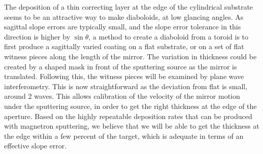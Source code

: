 \documentclass{iucr}       %
\begin{document}
The deposition of a thin correcting layer at the edge of the cylindrical substrate seems to be an attractive way to make diaboloids, at low glancing angles. %
As sagittal slope errors are typically small, and the slope error tolerance in this direction is higher by $\sin\theta$, a method to create a diaboloid from a toroid is to first produce a sagittally varied coating on a flat substrate, or on a set of flat witness pieces along the length of the mirror. The variation in thickness could be created by a shaped mask in front of the sputtering source as the mirror is translated. Following this, the witness pieces will be examined by plane wave interferometry. This is now straightforward as the deviation from flat is small, around 2 waves. This allows calibration of the velocity of the mirror motion under the sputtering source, in order to get the right thickness at the edge of the aperture. Based on the highly repeatable deposition rates that can be produced with magnetron sputtering, we believe that we will be able to get the thickness at the edge within a few percent of the target, which is adequate in terms of an effective slope error. 
\end{document}
